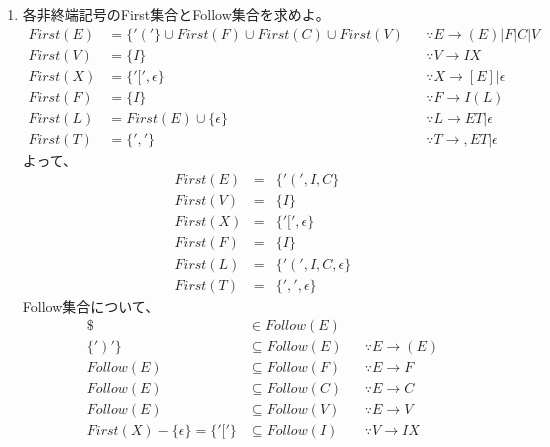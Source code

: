 \documentclass[a4paper,12pt]{jarticle}
\begin{document}
\begin{enumerate}
\renewcommand{\labelenumi}{(\alph{enumi})}
\item 各非終端記号のFirst集合とFollow集合を求めよ。\\
\begin{align*}
First \left( E \right) & = \{ ' \left( \right. ' \} \cup First \left( F \right) \cup First \left( C \right) \cup First \left( V \right) & & \because E \rightarrow \left( E \right) | F | C | V \\
First \left( V \right) & = \{ I \} & & \because V \rightarrow I X \\
First \left( X \right) & = \{ ' [ ' , \epsilon \} & & \because X \rightarrow [ E ] | \epsilon \\
First \left( F \right) & = \{ I \} & & \because F \rightarrow I \left( L \right) \\
First \left( L \right) & = First \left( E \right) \cup \{ \epsilon \} & & \because L \rightarrow E T | \epsilon \\
First \left( T \right) & = \{ ' , ' \} & & \because T \rightarrow , E T | \epsilon
\end{align*}
よって、
\begin{eqnarray*}
First \left( E \right) & = & \{ ' \left( \right. ' , I , C \}\\
First \left( V \right) & = & \{ I \} \\
First \left( X \right) & = & \{ ' [ ' , \epsilon \} \\
First \left( F \right) & = & \{ I \} \\
First \left( L \right) & = & \{ ' \left( \right. ' , I , C , \epsilon \} \\
First \left( T \right) & = & \{ ' , ' , \epsilon \}
\end{eqnarray*}
Follow集合について、
\begin{align*}
\$ & \in Follow \left( E \right) \\
\{ ' \left. \right) ' \} & \subseteq Follow \left( E \right) & & \because E \rightarrow \left( E \right) \\
Follow \left( E \right) & \subseteq Follow \left( F \right) & & \because E \rightarrow F \\
Follow \left( E \right) & \subseteq Follow \left( C \right) & & \because E \rightarrow C \\
Follow \left( E \right) & \subseteq Follow \left( V \right) & & \because E \rightarrow V \\
First \left( X \right) - \{ \epsilon \} = \{ ' [ ' \} & \subseteq Follow \left( I \right) & & \because V \rightarrow I X \\

\end{align*}
\end{enumerate}
\end{document}
